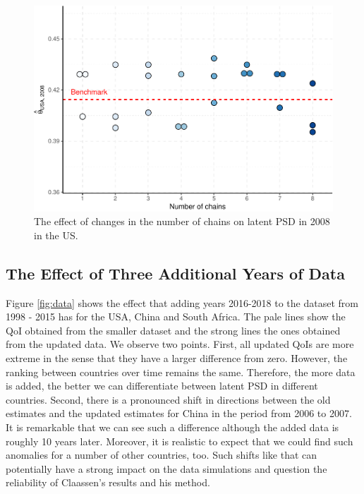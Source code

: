 \documentclass[12pt,english,a4paper,oneside]{article}
\theoremstyle{definition}
\theoremstyle{definition}
\theoremstyle{definition}
\theoremstyle{definition}
\theoremstyle{remark}
\begin{document}
\begin{figure}[H]
\includegraphics[width=\textwidth]{figs/chain-1} \caption[The effect of changes in the number of chains on latent PSD in 2008 in the US]{The effect of changes in the number of chains on latent PSD in 2008 in the US.}\label{fig:chain}
\end{figure}

\hypertarget{the-effect-of-three-additional-years-of-data}{%
\subsection{The Effect of Three Additional Years of Data}\label{the-effect-of-three-additional-years-of-data}}

Figure \ref{fig:data} shows the effect that adding years 2016-2018 to the dataset from 1998 - 2015 has for the USA, China and South Africa. The pale lines show the QoI obtained from the smaller dataset and the strong lines the ones obtained from the updated data. We observe two points. First, all updated QoIs are more extreme in the sense that they have a larger difference from zero. However, the ranking between countries over time remains the same. Therefore, the more data is added, the better we can differentiate between latent PSD in different countries. Second, there is a pronounced shift in directions between the old estimates and the updated estimates for China in the period from 2006 to 2007. It is remarkable that we can see such a difference although the added data is roughly 10 years later. Moreover, it is realistic to expect that we could find such anomalies for a number of other countries, too. Such shifts like that can potentially have a strong impact on the data simulations and question the reliability of Claassen's results and his method.
\end{document}
